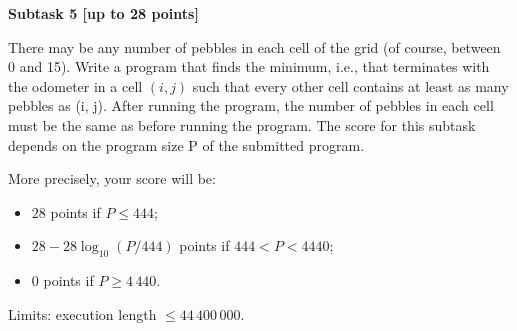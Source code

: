 {\bf Subtask 5 [up to 28 points] }

There may be any number of pebbles in each cell of the grid (of course, between 0 and 15). Write a program that finds the minimum, i.e., that terminates with the odometer in a cell $(i, j)$ such that every other cell contains at least as many pebbles as (i, j). After running the program, the number of pebbles in each cell must be the same as before running the program. The score for this subtask depends on the program size P of the submitted program. 

More precisely, your score will be:
\begin{itemize}
\item $28$ points if $P \le 444$;
\item $28 - 28 \log_{10} (P / 444)$ points if $444 < P < 4 440$;
\item $0$ points if $P \ge 4\,440$.
\end{itemize}

Limits: execution length $\le 44\,400\,000$.